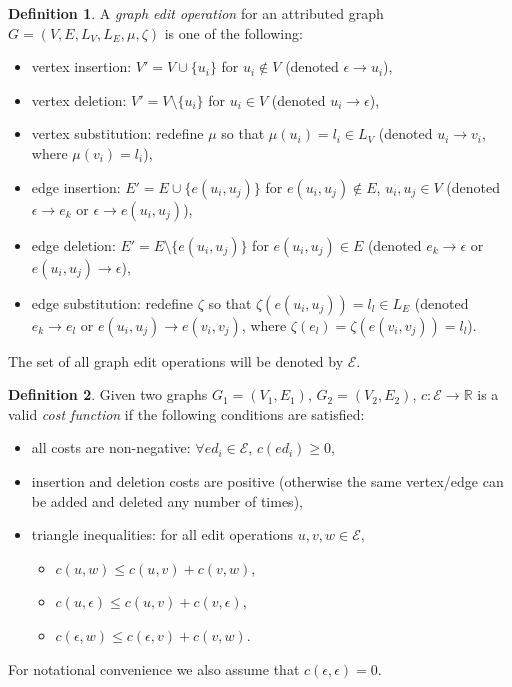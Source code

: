 \documentclass{article}
\theoremstyle{definition}
\newtheorem{definition}{Definition}
\begin{document}
\begin{definition}
  A \emph{graph edit operation} for an attributed graph $G = (V, E, L_V, L_E, \mu, \zeta)$ is one of the following:
  \begin{itemize}
  \item vertex insertion: $V' = V \cup \{ u_i \}$ for $u_i \not \in V$ (denoted $\epsilon \to u_i$),
  \item vertex deletion: $V' = V \setminus \{ u_i \}$ for $u_i \in V$ (denoted $u_i \to \epsilon$),
  \item vertex substitution: redefine $\mu$ so that $\mu(u_i) = l_i \in L_V$ (denoted $u_i \to v_i$, where $\mu(v_i) = l_i$),
  \item edge insertion: $E' = E \cup \{ e(u_i, u_j) \}$ for $e(u_i, u_j) \not \in E$, $u_i, u_j \in V$ (denoted $\epsilon \to e_k$ or $\epsilon \to e(u_i, u_j)$),
  \item edge deletion: $E' = E \setminus \{ e(u_i, u_j) \}$ for $e(u_i, u_j) \in E$ (denoted $e_k \to \epsilon$ or $e(u_i, u_j) \to \epsilon$),
  \item edge substitution: redefine $\zeta$ so that $\zeta(e(u_i, u_j)) = l_l \in L_E$ (denoted $e_k \to e_l$ or $e(u_i, u_j) \to e(v_i, v_j)$, where $\zeta(e_l)=\zeta(e(v_i, v_j))=l_l$).
  \end{itemize}
  The set of all graph edit operations will be denoted by $\mathcal{E}$.
\end{definition}
\begin{definition}
  \label{def:cost}
  Given two graphs $G_1 = (V_1, E_1)$, $G_2 = (V_2, E_2)$, $c: \mathcal{E} \to \mathbb{R}$ is a valid \emph{cost function} if the following conditions are satisfied:
  \begin{itemize}
  \item all costs are non-negative: $\forall ed_i \in \mathcal{E}$, $c(ed_i) \ge 0$,
  \item insertion and deletion costs are positive (otherwise the same vertex/edge can be added and deleted any number of times),
  \item triangle inequalities: for all edit operations $u, v, w \in \mathcal{E}$,
    \begin{itemize}
    \item $c(u, w) \le c(u, v) + c(v, w)$,
    \item $c(u, \epsilon) \le c(u, v) + c(v, \epsilon)$,
    \item $c(\epsilon, w) \le c(\epsilon, v) + c(v, w)$.
    \end{itemize}
  \end{itemize}
  For notational convenience we also assume that $c(\epsilon, \epsilon) = 0$.
\end{definition}
\end{document}
